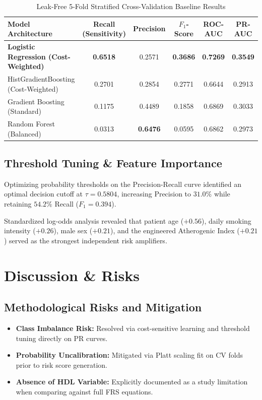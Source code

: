 \documentclass[manuscript, screen, review]{jair}
\begin{document}
\begin{table}[ht]
  \caption{Leak-Free 5-Fold Stratified Cross-Validation Baseline Results}
  \label{tab:results}
  \centering
  \begin{tabular}{@{}lccccc@{}}
    \toprule
    Model Architecture & Recall (Sensitivity) & Precision & $F_1$-Score & ROC-AUC & PR-AUC \\
    \midrule
    \textbf{Logistic Regression (Cost-Weighted)} & \textbf{0.6518} & 0.2571 & \textbf{0.3686} & \textbf{0.7269} & \textbf{0.3549} \\
    HistGradientBoosting (Cost-Weighted) & 0.2701 & 0.2854 & 0.2771 & 0.6644 & 0.2913 \\
    Gradient Boosting (Standard) & 0.1175 & 0.4489 & 0.1858 & 0.6869 & 0.3033 \\
    Random Forest (Balanced) & 0.0313 & \textbf{0.6476} & 0.0595 & 0.6862 & 0.2973 \\
    \bottomrule
  \end{tabular}
\end{table}

\subsection{Threshold Tuning \& Feature Importance}
Optimizing probability thresholds on the Precision-Recall curve identified an optimal decision cutoff at $\tau = 0.5804$, increasing Precision to $31.0\%$ while retaining $54.2\%$ Recall ($F_1 = 0.394$). 

Standardized log-odds analysis revealed that patient age ($+0.56$), daily smoking intensity ($+0.26$), male sex ($+0.21$), and the engineered Atherogenic Index ($+0.21$) served as the strongest independent risk amplifiers.

\section{Discussion \& Risks}

\subsection{Methodological Risks and Mitigation}
\begin{itemize}
    \item \textbf{Class Imbalance Risk:} Resolved via cost-sensitive learning and threshold tuning directly on PR curves.
    \item \textbf{Probability Uncalibration:} Mitigated via Platt scaling fit on CV folds prior to risk score generation.
    \item \textbf{Absence of HDL Variable:} Explicitly documented as a study limitation when comparing against full FRS equations.
\end{itemize}
\end{document}
